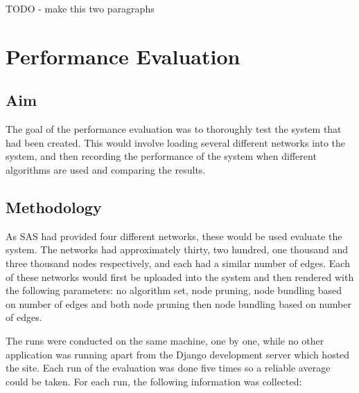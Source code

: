 \documentclass[../dissertation.tex]{subfiles}
\begin{document}
TODO - make this two paragraphs

\section{Performance Evaluation}

\subsection{Aim}

The goal of the performance evaluation was to thoroughly test the system that had been created. This would involve loading several different networks into the system, and then recording the performance of the system when different algorithms are used and comparing the results.

\subsection{Methodology}

As SAS had provided four different networks, these would be used evaluate the system. The networks had approximately thirty, two hundred, one thousand and three thousand nodes respectively, and each had a similar number of edges. Each of these networks would first be uploaded into the system and then rendered with the following parameters: no algorithm set, node pruning, node bundling based on number of edges and both node pruning then node bundling based on number of edges.

The runs were conducted on the same machine, one by one, while no other application was running apart from the Django development server which hosted the site. Each run of the evaluation was done five times so a reliable average could be taken. For each run, the following information was collected:
\end{document}
